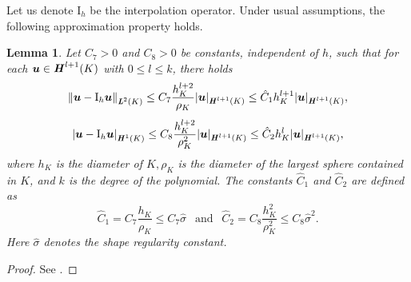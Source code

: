 \documentclass[10pt,a4paper]{article}
\newtheorem{lemma} {\bf Lemma}
\begin{document}
Let us denote $\mathrm{I}_h$ be the interpolation operator. Under usual assumptions, the following approximation property holds.
\begin{lemma}\label{error}
   Let $C_7>0$ and $C_{8}>0$ be constants, independent of $h$, such that for each $\boldsymbol{u} \in \textbf{\textit{H}}^{l+1}(K)$ with $0 \leq l \leq k$, there holds
$$
\begin{gathered}
\left\|\boldsymbol{u}-\mathrm{I}_h \boldsymbol{u} \right\|_{\textbf{\textit{L}}^2(K)} \leq C_7 \frac{h_K^{l+2}}{\rho_K}|\boldsymbol{u}|_{\textbf{\textit{H}}^{l+1}(K)} \leq \hat{C}_1 h_K^{l+1}|\boldsymbol{u}|_{\textbf{\textit{H}}^{l+1}(K)}, \\[4pt]
\left|\boldsymbol{u}-\mathrm{I}_h \boldsymbol{u} \right|_{\textbf{\textit{H}}^1(K)} \leq C_{8} \frac{h_K^{l+2}}{\rho_K^2}|\boldsymbol{u}|_{\textbf{\textit{H}}^{l+1}(K)} \leq \hat{C}_2 h_K^l|\boldsymbol{u}|_{\textbf{\textit{H}}^{l+1}(K)},
\end{gathered}
$$
where $h_K$ is the diameter of $K, \rho_K$ is the diameter of the largest sphere contained in $K$, and $k$ is the degree of the polynomial. The constants $\hat{C}_1$ and $\hat{C}_2$ are defined as
$$\hat{C}_1 = C_7\frac{ h_K}{\rho_K} \leq C_7 \hat{\sigma} \ \ \text{ and } \ \ \hat{C}_2 = C_{8} \frac{ h_K^2}{\rho_K^2} \leq C_{8} \hat{\sigma}^2. $$
Here $\hat{\sigma}$ denotes the shape regularity constant.
\end{lemma} 
\begin{proof}
    See \cite{MR2373954}.
\end{proof}
\end{document}
